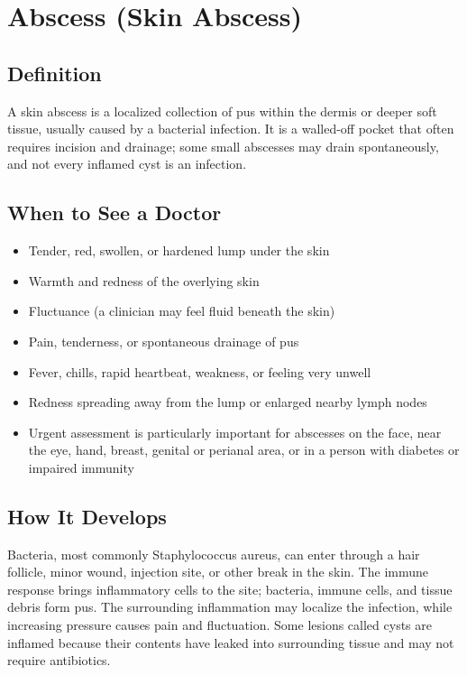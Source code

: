 \chapter{Abscess (Skin Abscess)}

\section*{Definition}
A skin abscess is a localized collection of pus within the dermis or deeper soft tissue, usually caused by a bacterial infection. It is a walled-off pocket that often requires incision and drainage; some small abscesses may drain spontaneously, and not every inflamed cyst is an infection.

\section*{When to See a Doctor}
\begin{itemize}
\item Tender, red, swollen, or hardened lump under the skin
\item Warmth and redness of the overlying skin
\item Fluctuance (a clinician may feel fluid beneath the skin)
\item Pain, tenderness, or spontaneous drainage of pus
\item Fever, chills, rapid heartbeat, weakness, or feeling very unwell
\item Redness spreading away from the lump or enlarged nearby lymph nodes
\item Urgent assessment is particularly important for abscesses on the face, near the eye, hand, breast, genital or perianal area, or in a person with diabetes or impaired immunity
\end{itemize}

\section*{How It Develops}
Bacteria, most commonly Staphylococcus aureus, can enter through a hair follicle, minor wound, injection site, or other break in the skin. The immune response brings inflammatory cells to the site; bacteria, immune cells, and tissue debris form pus. The surrounding inflammation may localize the infection, while increasing pressure causes pain and fluctuation. Some lesions called cysts are inflamed because their contents have leaked into surrounding tissue and may not require antibiotics.

